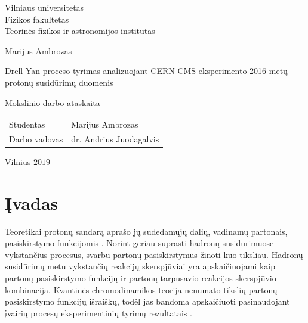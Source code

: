 \documentclass[a4paper, 12pt, twoside]{article}
\begin{document}

\begin{titlepage}
\centering
{\large Vilniaus universitetas \\ Fizikos fakultetas \\ Teorinės fizikos ir astronomijos institutas \par}
\vspace{3.5cm}
{\Large Marijus Ambrozas \par}
\vspace{0.3cm}
{\Large Drell-Yan proceso tyrimas analizuojant CERN CMS eksperimento 2016 metų protonų susidūrimų duomenis \par}
\vspace{0.8cm}
{\large Mokslinio darbo ataskaita \par}
\vspace{0.8cm}
\vspace{3.5cm}
{\large \begin{tabular*}{0.9\textwidth}{@{\extracolsep{\fill}}ll}
Studentas & Marijus Ambrozas\tabularnewline[0.5cm]
Darbo vadovas & dr. Andrius Juodagalvis\tabularnewline[0.5cm]
\end{tabular*} \par}
\vspace{4cm}
{\large Vilnius $2019$\par}
\end{titlepage}


\clearpage
\tableofcontents
\clearpage

\section{Įvadas}%

Teoretikai protonų sandarą aprašo jų sudedamųjų dalių, vadinamų partonais, pasiskirstymo funkcijomis \cite{NNPDF}.
Norint geriau suprasti hadronų susidūrimuose vykstančius procesus, svarbu partonų pasiskirstymus žinoti kuo tiksliau.
Hadronų susidūrimų metu vykstančių reakcijų skerspjūviai yra apskaičiuojami kaip partonų pasiskirstymo
funkcijų ir partonų tarpusavio reakcijos skerspjūvio kombinacija.
Kvantinės chromodinamikos teorija nenumato tikslių partonų pasiskirstymo funkcijų išraiškų, todėl jas bandoma
apskaičiuoti pasinaudojant įvairių procesų eksperimentinių tyrimų rezultatais \cite{NNPDF, PDF_CTEQ, PDF_ABMP16}.
\end{document}
